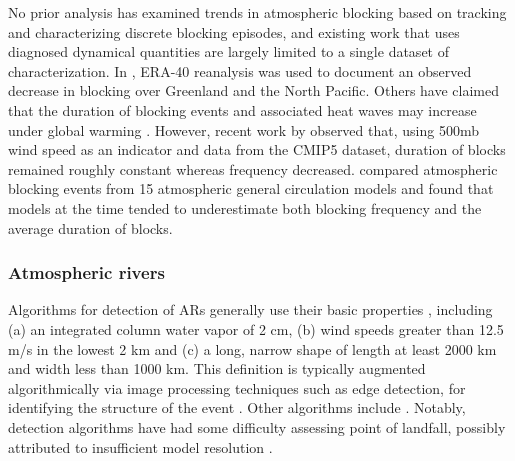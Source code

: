 \documentclass[11pt]{article}
\newcommand\citep{\cite}
\begin{document}
No prior analysis has examined trends in atmospheric blocking based on tracking and characterizing discrete blocking episodes, and existing work that uses diagnosed dynamical quantities are largely limited to a single dataset of characterization.  In \cite{croci2007multifaceted}, ERA-40 reanalysis was used to document an observed decrease in blocking over Greenland and the North Pacific.  Others have claimed that the duration of blocking events and associated heat waves may increase under global warming \citep{lupo1997climatological, beniston20042003}.  However, recent work by \cite{barnes2012methodology} observed that, using 500mb wind speed as an indicator and data from the CMIP5 dataset, duration of blocks remained roughly constant whereas frequency decreased.  \cite{dandrea1998northern} compared atmospheric blocking events from 15 atmospheric general circulation models and found that models at the time tended to underestimate both blocking frequency and the average duration of blocks.


\subsubsection{Atmospheric rivers}

Algorithms for detection of ARs generally use their basic properties \citep{ralph2011storms}, including (a) an integrated column water vapor of 2 cm, (b) wind speeds greater than 12.5 m/s in the lowest 2 km and (c) a long, narrow shape of length at least 2000 km and width less than 1000 km.  This definition is typically augmented algorithmically via image processing techniques such as edge detection, for identifying the structure of the event \citep{wick2013description}.  Other algorithms include \cite{zhu1998proposed, bao2006interpretation, dirmeyer2007characterization, gimeno2010origin, lavers2012detection}.   Notably, detection algorithms have had some difficulty assessing point of landfall, possibly attributed to insufficient model resolution \citep{wick2014implementation}.
\end{document}
